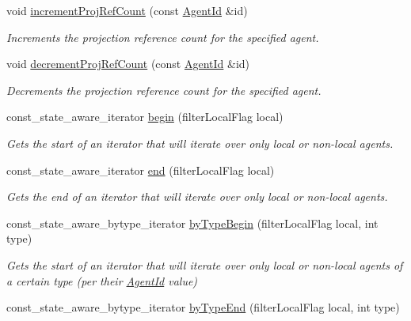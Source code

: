 \begin{DoxyCompactItemize}
void \hyperlink{classrepast_1_1_shared_context_a6515a8c1814265bdf371d421c1e0e672}{increment\-Proj\-Ref\-Count} (const \hyperlink{classrepast_1_1_agent_id}{Agent\-Id} \&id)
\begin{DoxyCompactList}\small\item\em Increments the projection reference count for the specified agent. \end{DoxyCompactList}\item 
void \hyperlink{classrepast_1_1_shared_context_a3baf1a56686971ebc513eabfe9c4b4e3}{decrement\-Proj\-Ref\-Count} (const \hyperlink{classrepast_1_1_agent_id}{Agent\-Id} \&id)
\begin{DoxyCompactList}\small\item\em Decrements the projection reference count for the specified agent. \end{DoxyCompactList}\item 
const\-\_\-state\-\_\-aware\-\_\-iterator \hyperlink{classrepast_1_1_shared_context_a2dd16dea7be7c83dc705f5a810dc3a5b}{begin} (filter\-Local\-Flag local)
\begin{DoxyCompactList}\small\item\em Gets the start of an iterator that will iterate over only local or non-\/local agents. \end{DoxyCompactList}\item 
const\-\_\-state\-\_\-aware\-\_\-iterator \hyperlink{classrepast_1_1_shared_context_a7c2c2cf54b4a050fe8ca940504295592}{end} (filter\-Local\-Flag local)
\begin{DoxyCompactList}\small\item\em Gets the end of an iterator that will iterate over only local or non-\/local agents. \end{DoxyCompactList}\item 
const\-\_\-state\-\_\-aware\-\_\-bytype\-\_\-iterator \hyperlink{classrepast_1_1_shared_context_a68db7f370b539b6efcf5559caca3202c}{by\-Type\-Begin} (filter\-Local\-Flag local, int type)
\begin{DoxyCompactList}\small\item\em Gets the start of an iterator that will iterate over only local or non-\/local agents of a certain type (per their \hyperlink{classrepast_1_1_agent_id}{Agent\-Id} value) \end{DoxyCompactList}\item 
const\-\_\-state\-\_\-aware\-\_\-bytype\-\_\-iterator \hyperlink{classrepast_1_1_shared_context_a4c25e43ac8dbcc5cba3965ec8dc67de7}{by\-Type\-End} (filter\-Local\-Flag local, int type)

\end{DoxyCompactItemize}
